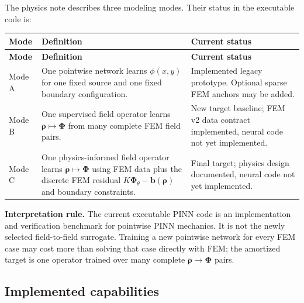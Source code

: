 \documentclass[11pt]{article}
\begin{document}
The physics note describes three modeling modes. Their status in the executable code is:
\begin{longtable}{>{\RaggedRight\arraybackslash}p{} >{\RaggedRight\arraybackslash}p{} >{\RaggedRight\arraybackslash}p{}}
\toprule
\textbf{Mode} & \textbf{Definition} & \textbf{Current status} \\
\midrule
\endfirsthead
\toprule
\textbf{Mode} & \textbf{Definition} & \textbf{Current status} \\
\midrule
\endhead
Mode A & One pointwise network learns $\phi(x,y)$ for one fixed source and one fixed boundary configuration. & Implemented legacy prototype. Optional sparse FEM anchors may be added. \\
Mode B & One supervised field operator learns $\bm{\rho}\mapsto\bm{\Phi}$ from many complete FEM field pairs. & New target baseline; FEM v2 data contract implemented, neural code not yet implemented. \\
Mode C & One physics-informed field operator learns $\bm{\rho}\mapsto\bm{\Phi}$ using FEM data plus the discrete FEM residual $K\bm{\Phi}_{\theta}-\bm{b}(\bm{\rho})$ and boundary constraints. & Final target; physics design documented, neural code not yet implemented. \\
\bottomrule
\end{longtable}

\begin{physicsbox}
\textbf{Interpretation rule.} The current executable PINN code is an implementation and verification benchmark for pointwise PINN mechanics. It is not the newly selected field-to-field surrogate. Training a new pointwise network for every FEM case may cost more than solving that case directly with FEM; the amortized target is one operator trained over many complete $\bm{\rho}\rightarrow\bm{\Phi}$ pairs.
\end{physicsbox}

\subsection{Implemented capabilities}
\end{document}
